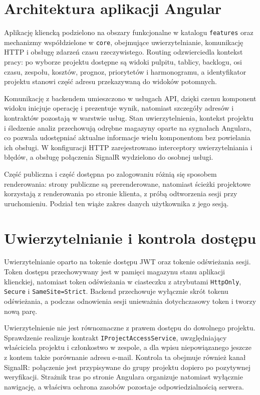 \section{Architektura aplikacji Angular}

Aplikację kliencką podzielono na obszary funkcjonalne w katalogu \texttt{features} oraz mechanizmy współdzielone w \texttt{core}, obejmujące uwierzytelnianie, komunikację HTTP i obsługę zdarzeń czasu rzeczywistego. Routing odzwierciedla kontekst pracy: po wyborze projektu dostępne są widoki pulpitu, tablicy, backlogu, osi czasu, zespołu, kosztów, prognoz, priorytetów i harmonogramu, a identyfikator projektu stanowi część adresu przekazywaną do widoków potomnych.

Komunikację z backendem umieszczono w usługach API, dzięki czemu komponent widoku inicjuje operację i prezentuje wynik, natomiast szczegóły adresów i kontraktów pozostają w warstwie usług. Stan uwierzytelnienia, kontekst projektu i śledzenie analiz przechowują odrębne magazyny oparte na sygnałach Angulara, co pozwala udostępniać aktualne informacje wielu komponentom bez powielania ich obsługi. W konfiguracji HTTP zarejestrowano interceptory uwierzytelniania i błędów, a obsługę połączenia SignalR wydzielono do osobnej usługi.

Część publiczna i część dostępna po zalogowaniu różnią się sposobem renderowania: strony publiczne są prerenderowane, natomiast ścieżki projektowe korzystają z renderowania po stronie klienta, z próbą odtworzenia sesji przy uruchomieniu. Podział ten wiąże zakres danych użytkownika z jego sesją.

\section{Uwierzytelnianie i kontrola dostępu}

Uwierzytelnianie oparto na tokenie dostępu JWT oraz tokenie odświeżania sesji. Token dostępu przechowywany jest w pamięci magazynu stanu aplikacji klienckiej, natomiast token odświeżania w ciasteczku z atrybutami \texttt{HttpOnly}, \texttt{Secure} i \texttt{SameSite=Strict}. Backend przechowuje wyłącznie skrót tokenu odświeżania, a podczas odnowienia sesji unieważnia dotychczasowy token i tworzy nową parę.

Uwierzytelnienie nie jest równoznaczne z prawem dostępu do dowolnego projektu. Sprawdzenie realizuje kontrakt \texttt{IProjectAccessService}, uwzględniający właściciela projektu i członkostwo w zespole, a dla wpisu niepowiązanego jeszcze z kontem także porównanie adresu e-mail. Kontrola ta obejmuje również kanał SignalR: połączenie jest przypisywane do grupy projektu dopiero po pozytywnej weryfikacji. Strażnik tras po stronie Angulara organizuje natomiast wyłącznie nawigację, a właściwa ochrona zasobów pozostaje odpowiedzialnością serwera.

